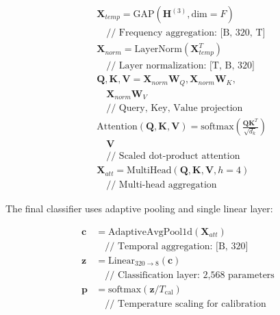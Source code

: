 \documentclass[lettersize,journal]{IEEEtran}
\begin{document}
\begin{tcolorbox}[colback=green!5!white,colframe=green!50!black,title=\textbf{Multi-Head Temporal Self-Attention}]
\begin{align}
&\mathbf{X}_{temp} = \text{GAP}(\mathbf{H}^{(3)}, \text{dim}=F) \nonumber\\
&\quad \text{// Frequency aggregation: [B, 320, T]} \nonumber\\[0.5em]
&\mathbf{X}_{norm} = \text{LayerNorm}(\mathbf{X}_{temp}^T) \nonumber\\
&\quad \text{// Layer normalization: [T, B, 320]} \nonumber\\[0.5em]
&\mathbf{Q}, \mathbf{K}, \mathbf{V} = \mathbf{X}_{norm} \mathbf{W}_Q, \mathbf{X}_{norm} \mathbf{W}_K, \nonumber\\
&\quad \mathbf{X}_{norm} \mathbf{W}_V \nonumber\\
&\quad \text{// Query, Key, Value projection} \nonumber\\[0.5em]
&\text{Attention}(\mathbf{Q}, \mathbf{K}, \mathbf{V}) = \text{softmax}\left(\frac{\mathbf{Q}\mathbf{K}^T}{\sqrt{d_k}}\right) \nonumber\\
&\quad \mathbf{V} \nonumber\\
&\quad \text{// Scaled dot-product attention} \nonumber\\[0.5em]
&\mathbf{X}_{att} = \text{MultiHead}(\mathbf{Q}, \mathbf{K}, \mathbf{V}, h=4) \\
&\quad \text{// Multi-head aggregation} \nonumber
\end{align}
\end{tcolorbox}

The final classifier uses adaptive pooling and single linear layer:

\begin{tcolorbox}[colback=orange!5!white,colframe=orange!50!black,title=\textbf{Classification and Calibration}]
\begin{align}
\mathbf{c} &= \text{AdaptiveAvgPool1d}(\mathbf{X}_{att}) \nonumber\\
&\quad \text{// Temporal aggregation: [B, 320]} \nonumber\\[0.5em]
\mathbf{z} &= \text{Linear}_{320\rightarrow8}(\mathbf{c}) \nonumber\\
&\quad \text{// Classification layer: 2,568 parameters} \nonumber\\[0.5em]
\mathbf{p} &= \text{softmax}(\mathbf{z}/T_{\text{cal}}) \\
&\quad \text{// Temperature scaling for calibration} \nonumber
\end{align}
\end{tcolorbox}
\end{document}
